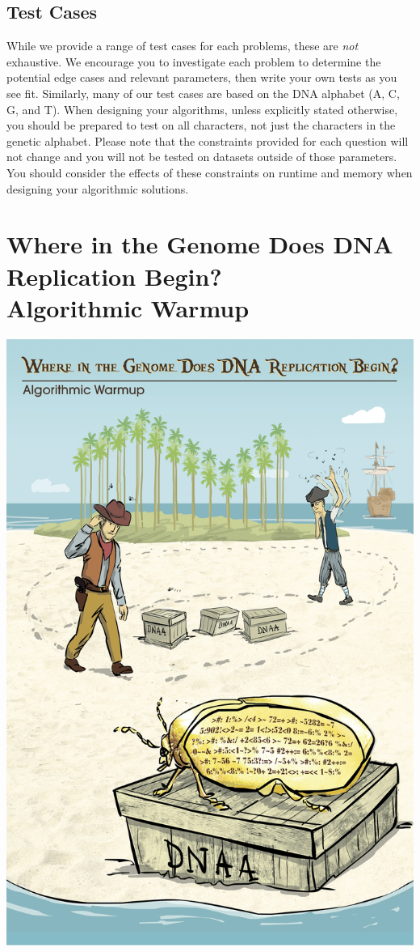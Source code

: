 \documentclass{article}
\begin{document}
\subsection*{Test Cases}
\hline \vspace{5}
While we provide a range of test cases for each problems, these are \emph{not} exhaustive. We encourage you to investigate each problem to determine the potential edge cases and relevant parameters, then write your own tests as you see fit. Similarly, many of our test cases are based on the DNA alphabet (A, C, G, and T). When designing your algorithms, unless explicitly stated otherwise, you should be prepared to test on all characters, not just the characters in the genetic alphabet. Please note that the constraints provided for each question will not change and you will not be tested on datasets outside of those parameters. You should consider the effects of these constraints on runtime and memory when designing your algorithmic solutions.
\pagebreak

\tableofcontents
\pagebreak

\section{Where in the Genome Does DNA Replication Begin?\\ Algorithmic Warmup}
\begin{center}
    \includegraphics[scale=0.72]{c1.jpg}
\end{center}
\pagebreak
\end{document}
